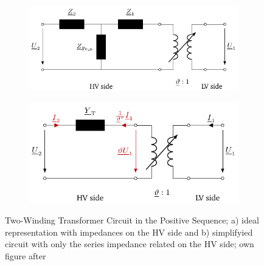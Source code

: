 \begin{figure}%
    \centering
    \begin{subfigure}[c]{.53\textwidth}
        \centering
        \includegraphics[width=\linewidth]{tikz_graphics/images/transformer_complete.pdf}
    \end{subfigure}
    \begin{subfigure}[c]{.46\textwidth}
        \centering
        \includegraphics[width=\linewidth]{tikz_graphics/images/transformer_reduced.pdf}
    \end{subfigure}
    \caption[Two-Winding Transformer Circuit in the Positive Sequence]{Two-Winding Transformer Circuit in the Positive Sequence; a) ideal representation with impedances on the \acs{HV} side and b) simplifyied circuit with only the series impedance related on the \acs{HV} side; own figure after \autocite{machowski_2020,kundur_2022,milano_2010}}
    \label{fig:trafo-model}
\end{figure}

